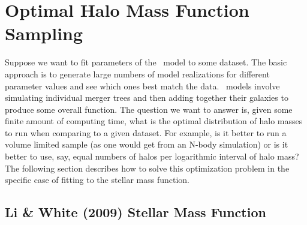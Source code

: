 \section{Optimal Halo Mass Function Sampling}

Suppose we want to fit parameters of the \glc\ model to some dataset. The basic approach is to generate large numbers of model realizations for different parameter values and see which ones best match the data. \glc\ models involve simulating individual merger trees and then adding together their galaxies to produce some overall function. The question we want to answer is, given some finite amount of computing time, what is the optimal distribution of halo masses to run when comparing to a given dataset. For example, is it better to run a volume limited sample (as one would get from an N-body simulation) or is it better to use, say, equal numbers of halos per logarithmic interval of halo mass? The following section describes how to solve this optimization problem in the specific case of fitting to the stellar mass function.

\subsection{Li \& White (2009) Stellar Mass Function}\label{sec:OptimalSamplingStellarMassFunction}

